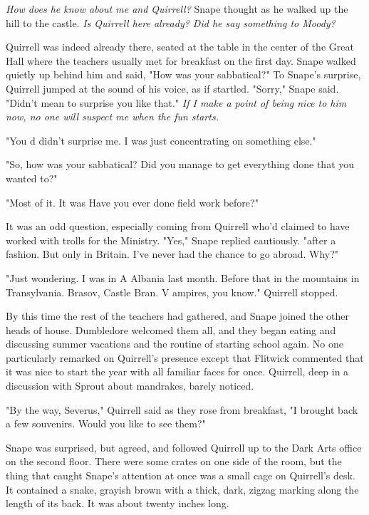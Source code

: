 \emph{How does he know about me and Quirrell?} Snape thought as he walked up the hill to the castle. \emph{Is Quirrell here already? Did he say something to Moody?}

Quirrell was indeed already there, seated at the table in the center of the Great Hall where the teachers usually met for breakfast on the first day. Snape walked quietly up behind him and said, "How was your sabbatical?" To Snape's surprise, Quirrell jumped at the sound of his voice, as if startled. "Sorry," Snape said. "Didn't mean to surprise you like that." \emph{If I make a point of being nice to him now, no one will suspect me when the fun starts.}

"You d{\el} didn't surprise me. I was just concentrating on something else."

"So, how was your sabbatical? Did you manage to get everything done that you wanted to?"

"Most of it. It was{\el} Have you ever done field work before?"

It was an odd question, especially coming from Quirrell who'd claimed to have worked with trolls for the Ministry. "Yes," Snape replied cautiously. "after a fashion. But only in Britain. I've never had the chance to go abroad. Why?"

"Just wondering. I was in A{\el} Albania last month. Before that in the mountains in Transylvania. Brasov, Castle Bran. V{\el} ampires, you know." Quirrell stopped.

By this time the rest of the teachers had gathered, and Snape joined the other heads of house. Dumbledore welcomed them all, and they began eating and discussing summer vacations and the routine of starting school again. No one particularly remarked on Quirrell's presence except that Flitwick commented that it was nice to start the year with all familiar faces for once. Quirrell, deep in a discussion with Sprout about mandrakes, barely noticed.

"By the way, Severus," Quirrell said as they rose from breakfast, "I brought back a few souvenirs. Would you like to see them?"

Snape was surprised, but agreed, and followed Quirrell up to the Dark Arts office on the second floor. There were some crates on one side of the room, but the thing that caught Snape's attention at once was a small cage on Quirrell's desk. It contained a snake, grayish brown with a thick, dark, zigzag marking along the length of its back. It was about twenty inches long.

